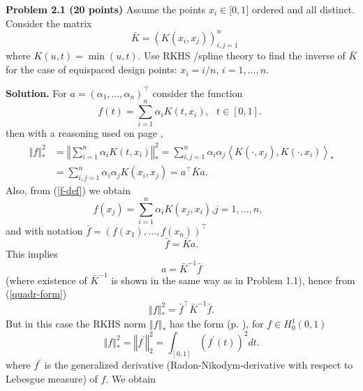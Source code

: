 \documentclass[11pt,twoside]{article}%
\theoremstyle{change}
\newenvironment{quote-env}{\begin{quote}\sffamily }{\end{quote}}
\newenvironment{mycomments-env}[1][Mycomments]{\textbf{#1.} \begin{quote-env} }{ \end{quote-env}  \ \rule{0.5em}{0.5em}}
\begin{document}
\textbf{Problem 2.1 (20 points) }Assume the points $x_{i}\in\lbrack0,1]$
ordered and all distinct. Consider the matrix
\begin{equation}
\text{ }\bar{K}=\left(  K\left(  x_{i},x_{j}\right)  \right)  _{i,j=1}%
^{n}\label{K-bar}%
\end{equation}
where $K\left(  u,t\right)  =\min(u,t)$. Use RKHS /spline theory to find the
inverse of $\bar{K}$ for the case of equispaced design points: $x_{i}=i/n$,
$i=1,\ldots,n$.%

\begin{mycomments}%


\begin{mycomments-env}
\textbf{Solution. }For $a=\left(  \alpha_{1},\ldots,\alpha_{n}\right)  ^{\top
}$ consider the function
\begin{equation}
f(t)=\sum_{i=1}^{n}\alpha_{i}K\left(  t,x_{i}\right)  ,\text{ }t\in\left[
0,1\right]  \text{. }\label{f-def}%
\end{equation}
then with a reasoning used on page \pageref{solution-lin-smooth-spline},
\begin{align}
\left\Vert f\right\Vert _{\ast}^{2}  & =\left\Vert \sum_{i=1}^{n}\alpha
_{i}K\left(  t,x_{i}\right)  \right\Vert _{\ast}^{2}=\sum_{i,j=1}^{n}%
\alpha_{i}\alpha_{j}\left\langle K\left(  \cdot,x_{j}\right)  ,K\left(
\cdot,x_{i}\right)  \right\rangle _{\ast}\nonumber\\
& =\sum_{i,j=1}^{n}\alpha_{i}\alpha_{j}K\left(  x_{i},x_{j}\right)  =a^{\top
}\bar{K}a.\label{quadr-form}%
\end{align}
Also, from (\ref{f-def}) we obtain
\[
f(x_{j})=\sum_{i=1}^{n}\alpha_{i}K\left(  x_{j},x_{i}\right)  \text{,
}j=1,\ldots,n,\text{ }%
\]
and with notation $\bar{f}=\left(  f(x_{1}),\ldots,f(x_{n})\right)  ^{\top}$%
\[
\bar{f}=\bar{K}a\text{.}%
\]
This implies
\[
a=\bar{K}^{-1}\bar{f}%
\]
(where existence of $\bar{K}^{-1}$ is shown in the same way as in Problem
1.1), hence from (\ref{quadr-form})%
\[
\left\Vert f\right\Vert _{\ast}^{2}=\bar{f}^{\top}\bar{K}^{-1}\bar{f}.
\]
But in this case the RKHS norm $\left\Vert f\right\Vert _{\ast}$ has the form
(p. \pageref{solution-lin-smooth-spline}), for $f\in H_{0}^{1}(0,1)$
\[
\left\Vert f\right\Vert _{\ast}^{2}=\left\Vert f^{\prime}\right\Vert _{2}%
^{2}=\int_{\left[  0,1\right]  }\left(  f^{\prime}(t)\right)  ^{2}dt.
\]
where $f^{\prime}$ is the generalized derivative (Radon-Nikodym-derivative
with respect to Lebesgue measure) of $f$. We obtain

\end{mycomments-env}
\end{mycomments}
\end{document}
